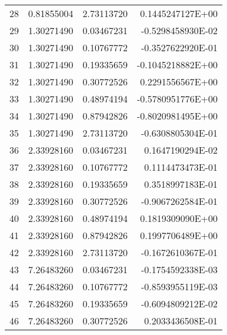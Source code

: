\begin{longtable}{@{\extracolsep{\fill}}cllr@{}}
28  &  0.81855004  &  2.73113720  &   0.1445247127E+00 \\

29  &  1.30271490  &  0.03467231  &  -0.5298458930E-02 \\

30  &  1.30271490  &  0.10767772  &  -0.3527622920E-01 \\

31  &  1.30271490  &  0.19335659  &  -0.1045218882E+00 \\

32  &  1.30271490  &  0.30772526  &   0.2291556567E+00 \\

33  &  1.30271490  &  0.48974194  &  -0.5780951776E+00 \\

34  &  1.30271490  &  0.87942826  &  -0.8020981495E+00 \\

35  &  1.30271490  &  2.73113720  &  -0.6308805304E-01 \\

36  &  2.33928160  &  0.03467231  &   0.1647190294E-02 \\

37  &  2.33928160  &  0.10767772  &   0.1114473473E-01 \\

38  &  2.33928160  &  0.19335659  &   0.3518997183E-01 \\

39  &  2.33928160  &  0.30772526  &  -0.9067262584E-01 \\

40  &  2.33928160  &  0.48974194  &   0.1819309090E+00 \\

41  &  2.33928160  &  0.87942826  &   0.1997706489E+00 \\

42  &  2.33928160  &  2.73113720  &  -0.1672610367E-01 \\

43  &  7.26483260  &  0.03467231  &  -0.1754592338E-03 \\

44  &  7.26483260  &  0.10767772  &  -0.8593955119E-03 \\

45  &  7.26483260  &  0.19335659  &  -0.6094809212E-02 \\

46  &  7.26483260  &  0.30772526  &   0.2033436508E-01 \\


\end{longtable}

